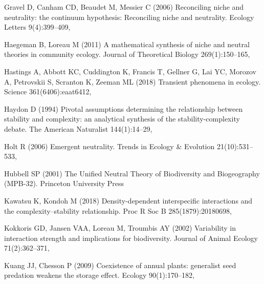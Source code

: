 \documentclass[a4paper,12pt]{article}
\begin{document}
\begin{thebibliography}{56}
Gravel D, Canham CD, Beaudet M, Messier C (2006) Reconciling niche and
  neutrality: the continuum hypothesis: {Reconciling} niche and neutrality.
  Ecology Letters 9(4):399--409, 

Haegeman B, Loreau M (2011) A mathematical synthesis of niche and neutral
  theories in community ecology. Journal of Theoretical Biology
  269(1):150--165, 

Hastings A, Abbott KC, Cuddington K, Francis T, Gellner G, Lai YC, Morozov A,
  Petrovskii S, Scranton K, Zeeman ML (2018) Transient phenomena in ecology.
  Science 361(6406):eaat6412, 

Haydon D (1994) Pivotal assumptions determining the relationship between
  stability and complexity: an analytical synthesis of the stability-complexity
  debate. The American Naturalist 144(1):14--29, 

Holt R (2006) Emergent neutrality. Trends in Ecology \& Evolution
  21(10):531--533, 

Hubbell SP (2001) The {Unified} {Neutral} {Theory} of {Biodiversity} and
  {Biogeography} ({MPB}-32). Princeton University Press

Kawatsu K, Kondoh M (2018) Density-dependent interspecific interactions and the
  complexity--stability relationship. Proc R Soc B 285(1879):20180698,

Kokkoris GD, Jansen VAA, Loreau M, Troumbis AY (2002) Variability in
  interaction strength and implications for biodiversity. Journal of Animal
  Ecology 71(2):362--371, 

Kuang JJ, Chesson P (2009) Coexistence of annual plants: generalist seed
  predation weakens the storage effect. Ecology 90(1):170--182,


\end{thebibliography}
\end{document}

